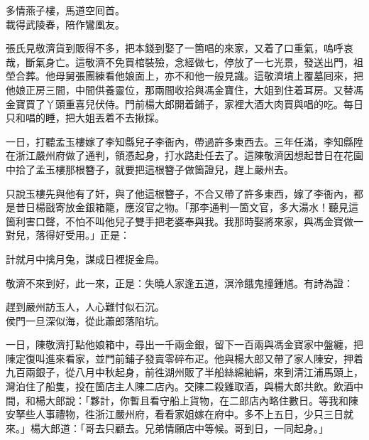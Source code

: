 \begin{myquote}
多情燕子樓，馬道空囘首。\\載得武陵春，陪作鸞凰友。
\end{myquote}

張氏見敬濟貨到販得不多，把本錢到娶了一箇唱的來家，又着了口重氣，嗚呼哀哉，斷氣身亡。{}這敬濟不免買棺裝殮，念經做七，停放了一七光景，發送出門，祖塋合葬。他母舅張團練看他娘面上，亦不和他一般見識。{}這敬濟墳上覆墓囘來，把他娘正房三間，中間供養靈位，那兩間收拾與馮金寶住，大姐到住着耳房。又替馮金寶買了丫頭重喜兒伏侍。門前楊大郎開着鋪子，家裡大酒大肉買與唱的吃。每日只和唱的睡，把大姐丟着不去揪採。

一日，打聽孟玉樓嫁了李知縣兒子李衙內，帶過許多東西去。三年任滿，李知縣陞在浙江嚴州府做了通判，領憑起身，打水路赴任去了。這陳敬濟因想起昔日在花園中拾了孟玉樓那根簪子，就要把這根簪子做箇證兒，趕上嚴州去。

只說玉樓先與他有了奸，與了他這根簪子，不合又帶了許多東西，嫁了李衙內，都是昔日楊戩寄放金銀箱籠，應沒官之物。{}「那李通判一箇文官，多大湯水！聽見這箇利害口聲，不怕不叫他兒子雙手把老婆奉與我。我那時娶將來家，與馮金寶做一對兒，落得好受用。」正是：

\begin{myquote}
計就月中擒月兔，謀成日裡捉金烏。
\end{myquote}

敬濟不來到好，此一來，正是：失曉人家逢五道，溟泠餓鬼撞鍾馗。有詩為證：

\begin{myquote}
趕到嚴州訪玉人，人心難忖似石沉。\\侯門一旦深似海，從此蕭郎落陷坑。
\end{myquote}

一日，陳敬濟打點他娘箱中，尋出一千兩金銀，留下一百兩與馮金寶家中盤纏，把陳定復叫進來看家，並門前鋪子發賣零碎布疋。他與楊大郎又帶了家人陳安，押着九百兩銀子，從八月中秋起身，前徃湖州販了半船絲綿紬絹，來到清江浦馬頭上，灣泊住了船隻，投在箇店主人陳二店內。交陳二殺雞取酒，與楊大郎共飲。飲酒中間，和楊大郎說：「夥計，你暫且看守船上貨物，{}在二郎店內略住數日。等我和陳安拏些人事禮物，徃浙江嚴州府，看看家姐嫁在府中。多不上五日，少只三日就來。」楊大郎道：「哥去只顧去。兄弟情願店中等候。哥到日，一同起身。」

